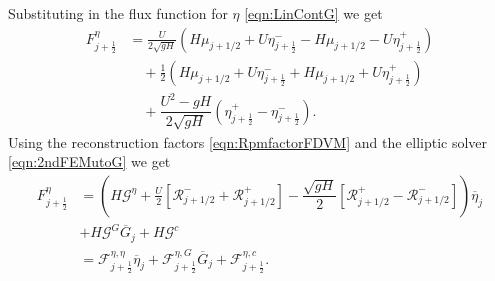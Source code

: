 Substituting in the flux function for $\eta$ \eqref{eqn:LinContG} we get
\begin{align}
F^\eta_{j+\frac{1}{2}} &= \frac{U}{2 \sqrt{gH}} \left( H\mu_{j+1/2} + U\eta^-_{j+\frac{1}{2}} -  H\mu_{j+1/2} - U \eta^+_{j+\frac{1}{2}} \right)   \nonumber \\ & \quad + \frac{1}{2}\left(H\mu_{j+1/2} + U\eta^-_{j+\frac{1}{2}} +  H\mu_{j+1/2} + U \eta^+_{j+\frac{1}{2}}\right) \nonumber \\ &\quad + \dfrac{U^2 - gH}{2\sqrt{g H}} \left (\eta^+_{j+\frac{1}{2}} - \eta^-_{j+\frac{1}{2}} \right).
\end{align}
Using the reconstruction factors \eqref{eqn:RpmfactorFDVM} and the elliptic solver \eqref{eqn:2ndFEMutoG} we get
\begin{align}
F^\eta_{j+\frac{1}{2}} &= \left(H\mathcal{G}^{\eta}  + \frac{U}{2}\left[ \mathcal{R}^-_{j+1/2} +  \mathcal{R}^+_{j+1/2}\right]- \dfrac{\sqrt{gH}}{2} \left [ \mathcal{R}^+_{j+1/2} - \mathcal{R}^-_{j+1/2} \right ] \right) \overline{\eta}_j \nonumber \\& + H\mathcal{G}^G \overline{G}_{j} + H \mathcal{G}^c \nonumber \\ &= \mathcal{F}^{\eta, \eta}_{j+\frac{1}{2}} \overline{\eta}_{j} + \mathcal{F}^{\eta, G}_{j+\frac{1}{2}} \overline{G}_{j} + \mathcal{F}^{\eta, c}_{j+\frac{1}{2}} .
\label{eqn:Fluxfactorsubcriteta}
\end{align}

